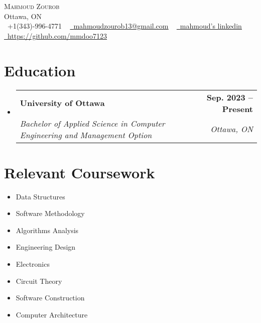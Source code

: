 \documentclass[letterpaper,11pt]{article}
\makeatletter
\newcommand{\resumeSubheading}[4]{
  \vspace{-2pt}\item
    \begin{tabular*}{1.0\textwidth}[t]{l@{\extracolsep{\fill}}r}
      \textbf{#1} & \textbf{\small #2} \\
      \textit{\small#3} & \textit{\small #4} \\
    \end{tabular*}\vspace{-7pt}
}
\newcommand{\resumeSubHeadingListStart}{\begin{itemize}[leftmargin=0.0in, label={}]}
\newcommand{\resumeSubHeadingListEnd}{\end{itemize}}
\makeatother
\begin{document}

\begin{center}
    {\Huge \scshape Mahmoud Zourob} \\ \vspace{1pt}
    Ottawa, ON \\ \vspace{1pt}
    \small \raisebox{-0.1\height}\faPhone\ +1(343)-996-4771 ~ \href{mailto:mahmoudzourob13@gmail.com}{\raisebox{-0.2\height}\faEnvelope\  \underline{mahmoudzourob13@gmail.com}} ~ 
    \href{https://www.linkedin.com/in/mahmoud-zourob-24401829b?lipi=urn%3Ali%3Apage%3Ad_flagship3_profile_view_base_contact_details%3BQ%2BGufJQ6TKqZ0zACG2Eq6g%3D%3D}{\raisebox{-0.2\height}\faLinkedin\ \underline{mahmoud's linkedin}}  ~
    \href{https://github.com/mmdoo7123/}{\raisebox{-0.2\height}\faGithub\ \underline{https://github.com/mmdoo7123}}
    \vspace{-8pt}
\end{center}


\section{Education}
  \resumeSubHeadingListStart
    \resumeSubheading
      {University of Ottawa}{Sep. 2023 -- Present}
      {Bachelor of Applied Science in Computer Engineering and Management Option}{Ottawa, ON}
  \resumeSubHeadingListEnd

\section{Relevant Coursework}
        \begin{multicols}{4}
            \begin{itemize}[itemsep=-5pt, parsep=3pt]
                \item\small Data Structures
                \item Software Methodology
                \item Algorithms Analysis
                \item Engineering Design
                \item Electronics
                \item Circuit Theory
                \item Software Construction
                \item Computer Architecture
            \end{itemize}
        \end{multicols}
        \vspace*{2.0\multicolsep}
\end{document}
